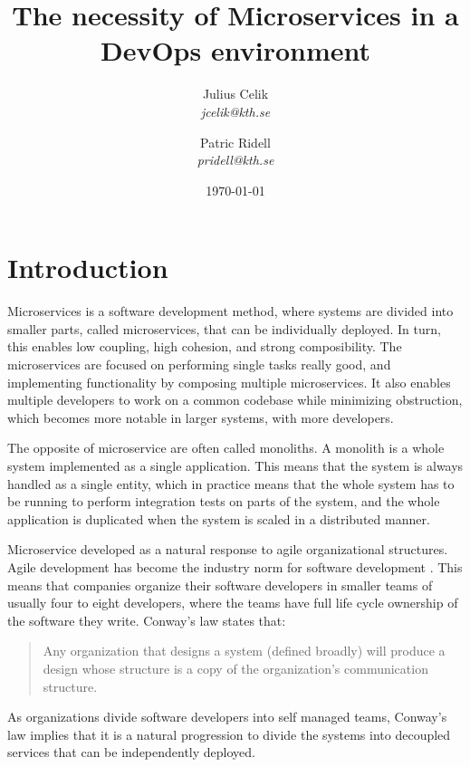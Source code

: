 \documentclass{article}
\title{The necessity of Microservices in a DevOps environment}
\author{
{Julius Celik}\\
\textit{
    jcelik@kth.se
} \and {Patric Ridell}\\
\textit{
    pridell@kth.se
}}
\date{\today{}}
\begin{document}
\maketitle


\section{Introduction}
Microservices is a software development method, where systems are divided into smaller parts, called microservices, that can be individually deployed. In turn, this enables low coupling, high cohesion, and strong composibility. The microservices are focused on performing single tasks really good, and implementing functionality by composing multiple microservices. It also enables multiple developers to work on a common codebase while minimizing obstruction, which becomes more notable in larger systems, with more developers.

The opposite of microservice are often called monoliths. A monolith is a whole system implemented as a single application. This means that the system is always handled as a single entity, which in practice means that the whole system has to be running to perform integration tests on parts of the system, and the whole application is duplicated when the system is scaled in a distributed manner.

Microservice developed as a natural response to agile organizational structures. Agile development has become the industry norm for software development \cite{Jeremiah}. This means that companies organize their software developers in smaller teams of usually four to eight developers, where the teams have full life cycle ownership of the software they write. Conway's law states that:
\begin{quote}
    Any organization that designs a system (defined broadly) will produce a design whose structure is a copy of the organization's communication structure. \cite{Conway}
\end{quote}

As organizations divide software developers into self managed teams, Conway's law implies that it is a natural progression to divide the systems into decoupled services that can be independently deployed.

\end{document}
